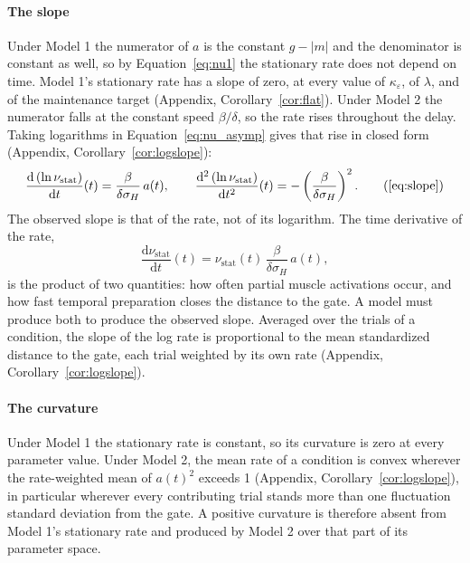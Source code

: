\documentclass[a4paper,11pt]{article}
\theoremstyle{definition}
\newcommand{\dd}{\mathrm d}
\newcommand{\nustat}{{\nu }_{\mathrm{stat}}}
\newcommand{\1}{\mathbbm{1}}
\begin{document}
\paragraph{The slope}

Under Model 1 the numerator of $a$ is the constant $g-|m|$ and the denominator is constant as well, so by Equation~\eqref{eq:nu1} the stationary rate does not depend on time. Model 1's stationary rate has a slope of zero, at every value of $\kappa_{\varepsilon}$, of $\lambda$, and of the maintenance target (Appendix, Corollary~\ref{cor:flat}). Under Model 2 the numerator falls at the constant speed $\beta/\delta$, so the rate rises throughout the delay. Taking logarithms in Equation~\eqref{eq:nu_asymp} gives that rise in closed form (Appendix, Corollary~\ref{cor:logslope}):
\begin{equation*}
\frac{\dd\left(\ln\nustat\right)}{\dd t}(t)=\frac{\beta}{\delta\sigma_{H}}\,a(t), \qquad \frac{\dd^{2}\left(\ln\nustat\right)}{\dd t^{2}}(t)=-\left(\frac{\beta}{\delta\sigma_{H}}\right)^{2}.
\tag{\ref{eq:slope}}
\end{equation*}
The observed slope is that of the rate, not of its logarithm. The time derivative of the rate,
\begin{equation*}
\frac{\dd\nustat}{\dd t}(t)=\nustat(t)\,\frac{\beta}{\delta\sigma_{H}}\,a(t),
\end{equation*}
is the product of two quantities: how often partial muscle activations occur, and how fast temporal preparation closes the distance to the gate. A model must produce both to produce the observed slope. Averaged over the trials of a condition, the slope of the log rate is proportional to the mean standardized distance to the gate, each trial weighted by its own rate (Appendix, Corollary~\ref{cor:logslope}).

\paragraph{The curvature}

Under Model 1 the stationary rate is constant, so its curvature is zero at every parameter value. Under Model 2, the mean rate of a condition is convex wherever the rate-weighted mean of $a(t)^{2}$ exceeds 1 (Appendix, Corollary~\ref{cor:logslope}), in particular wherever every contributing trial stands more than one fluctuation standard deviation from the gate. A positive curvature is therefore absent from Model 1's stationary rate and produced by Model 2 over that part of its parameter space.
\end{document}

